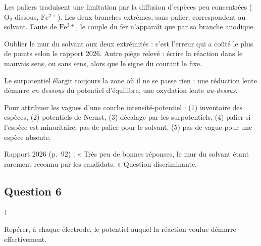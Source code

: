 \documentclass[11pt,a4paper]{article}
\begin{document}
Les paliers traduisent une limitation par la diffusion d'espèces peu concentrées (\(\mathrm{O_2}\) dissous, \(\mathrm{Fe^{2+}}\)). Les deux branches extrêmes, sans palier, correspondent au solvant. Faute de \(\mathrm{Fe^{3+}}\), le couple du fer n'apparaît que par sa branche anodique.

\begin{piege}

Oublier le mur du solvant aux deux extrémités : c'est l'erreur qui a coûté le plus de points selon le rapport 2026. Autre piège relevé : écrire la réaction dans le mauvais sens, ou sans sens, alors que le signe du courant le fixe.

\end{piege}

\begin{piege}

Le surpotentiel élargit toujours la zone où il ne se passe rien : une réduction lente démarre \emph{en dessous} du potentiel d'équilibre, une oxydation lente \emph{au-dessus}.

\end{piege}

\begin{methode}

Pour attribuer les vagues d'une courbe intensité-potentiel : (1) inventaire des espèces, (2) potentiels de Nernst, (3) décalage par les surpotentiels, (4) palier si l'espèce est minoritaire, pas de palier pour le solvant, (5) pas de vague pour une espèce absente.

\end{methode}

\begin{jury}

Rapport 2026 (p.~92) : « Très peu de bonnes réponses, le mur du solvant étant rarement reconnu par les candidats. » Question discriminante.

\end{jury}

\hypertarget{question-6}{%
\subsection{Question 6}\label{question-6}}

\begin{indication}{1}

Repérer, à chaque électrode, le potentiel auquel la réaction voulue démarre effectivement.

\end{indication}
\end{document}
